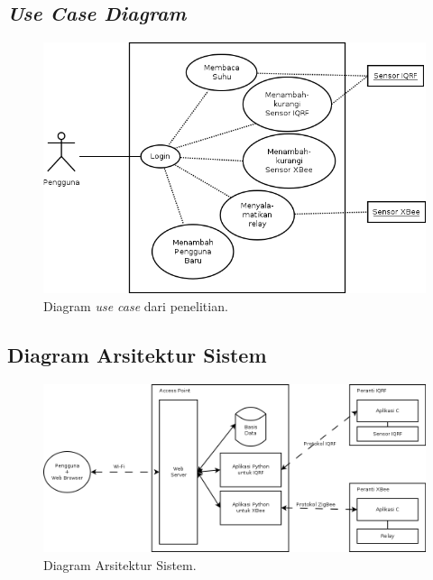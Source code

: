 		\subsection{\emph{Use Case Diagram}}
			\begin{figure}[ht!]
			  \centering
			    \includegraphics{gambar/usecase}
			    \caption{Diagram \emph{use case} dari penelitian.}
			    \label{usecase}
			\end{figure}

		\subsection{Diagram Arsitektur Sistem}
			\begin{figure}[ht!]
			  \centering
			    \includegraphics{gambar/system-architecture}
			    \caption{Diagram Arsitektur Sistem.}
			    \label{system-architecture}
			\end{figure}


